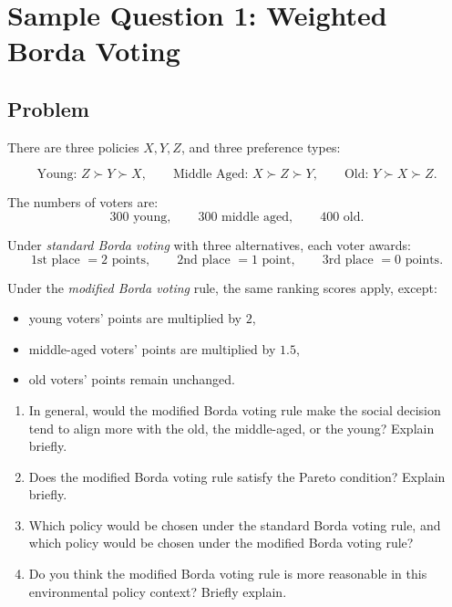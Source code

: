 \documentclass[12pt]{article}
\begin{document}

\newpage
\section{Sample Question 1: Weighted Borda Voting}

\subsection{Problem}

There are three policies \(X,Y,Z\), and three preference types:

\[
\text{Young: } Z \succ Y \succ X,
\qquad
\text{Middle Aged: } X \succ Z \succ Y,
\qquad
\text{Old: } Y \succ X \succ Z.
\]

The numbers of voters are:
\[
300 \text{ young}, \qquad 300 \text{ middle aged}, \qquad 400 \text{ old}.
\]

Under \emph{standard Borda voting} with three alternatives, each voter awards:
\[
\text{1st place } = 2 \text{ points}, 
\qquad
\text{2nd place } = 1 \text{ point}, 
\qquad
\text{3rd place } = 0 \text{ points}.
\]

Under the \emph{modified Borda voting} rule, the same ranking scores apply, except:
\begin{itemize}[leftmargin=*]
    \item young voters' points are multiplied by \(2\),
    \item middle-aged voters' points are multiplied by \(1.5\),
    \item old voters' points remain unchanged.
\end{itemize}

\begin{enumerate}[label=(\alph*)]
    \item In general, would the modified Borda voting rule make the social decision tend to align more with the old, the middle-aged, or the young? Explain briefly.
    \item Does the modified Borda voting rule satisfy the Pareto condition? Explain briefly.
    \item Which policy would be chosen under the standard Borda voting rule, and which policy would be chosen under the modified Borda voting rule?
    \item Do you think the modified Borda voting rule is more reasonable in this environmental policy context? Briefly explain.
\end{enumerate}
\end{document}
